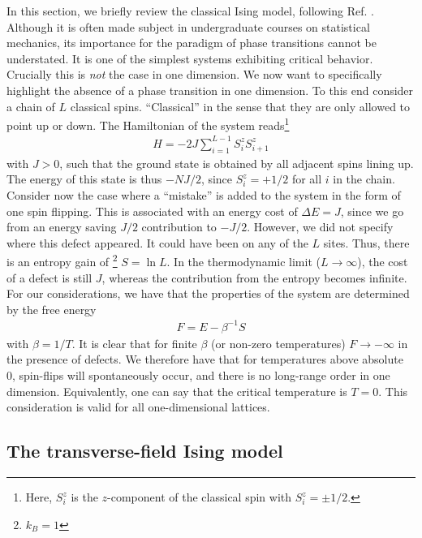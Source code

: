 In this section, we briefly review the classical Ising model, following Ref.
\cite{blundellMagnetismCondensedMatter2011}. Although it is
often made subject in undergraduate courses on statistical mechanics, its
importance for the paradigm of phase transitions cannot be understated. It is
one of the simplest systems exhibiting critical behavior. Crucially this is
\emph{not} the case in one
dimension. We now want to specifically highlight the absence of a phase transition
in one dimension. To this end consider a chain of $L$ classical spins.
\enquote{Classical} in the sense that they are only allowed to point up or
down. The Hamiltonian of the system reads\footnote{Here, $S^z_i$ is the
$z$-component of the classical spin with $S^z_i = \pm 1 /2$.}
\begin{align}
  H = -2J\sum_{i=1}^{L-1} S^z_i S^z_{i+1}
\end{align}
with $J>0$, such that the ground state is obtained by all adjacent spins lining
up. The energy of this state is thus $-NJ /2$, since $S^z_i = +1 /2$ for all
$i$ in the chain. Consider now the case where a \enquote{mistake} is added to
the system in the form of one spin flipping. This is associated with an energy
cost of $\Delta E=J$, since we go from an energy saving $J /2$ contribution to
$-J /2$. However, we did not specify where this defect appeared. It could have
been on any of the $L$ sites. Thus, there is an entropy gain of
\footnote{$k_B=1$} $S = \ln L$. In the thermodynamic limit ($L\to \infty$), the
cost of a defect is still $J$, whereas the contribution from the entropy
becomes infinite. For our considerations, we have that the properties of the
system are determined by the free energy 
\begin{align}
  F = E - \beta^{-1} S
\end{align}
with $\beta = 1 / T$. It is clear that for finite $\beta$ (or non-zero
temperatures) $F \to -\infty$ in the presence of defects. We therefore have
that for temperatures above absolute 0, spin-flips will spontaneously occur,
and there is no long-range order in one dimension. Equivalently, one can say
that the critical temperature is $T=0$. This consideration is valid for all
one-dimensional lattices.

\subsection{The transverse-field Ising model}

